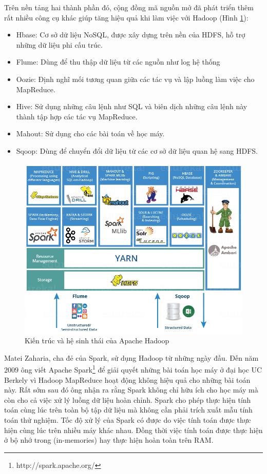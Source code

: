 Trên nền tảng hai thành phần đó, cộng đồng mã nguồn mở đã phát triển thêm rất nhiều công cụ khác giúp tăng hiệu quả khi làm việc với Hadoop (Hình \ref{fig:hadoop}):
\begin{itemize}
\item Hbase: Cơ sở dữ liệu NoSQL, được xây dựng trên nền của HDFS, hỗ trợ những dữ liệu phi cấu trúc.

\item Flume: Dùng để thu thập dữ liệu từ các nguồn như log hệ thống

\item Oozie: Định nghĩ mối tương quan giữa các tác vụ và lập luồng làm việc cho MapReduce.

\item Hive: Sử dụng những câu lệnh như SQL và biên dịch những câu lệnh này thành tập hợp các tác vụ MapReduce.

\item Mahout: Sử dụng cho các bài toán về học máy.

\item Sqoop: Dùng để chuyển đổi dữ liệu từ các cơ sở dữ liệu quan hệ sang HDFS.
\end{itemize}

\begin{figure}[H]
	\centering
	\includegraphics[width=0.9\linewidth]{Chapter4/Chapter4Figs/hadoop}
	\caption{Kiến trúc và hệ sinh thái của Apache Hadoop}
	\label{fig:hadoop}
\end{figure}

Matei Zaharia, cha đẻ của Spark, sử dụng Hadoop từ những ngày đầu. Đến năm $2009$ ông viết Apache Spark\footnote{http://spark.apache.org/} để giải quyết những bài toán học máy ở đại học UC Berkely vì Hadoop MapReduce hoạt động không hiệu quả cho những bài toán này. Rất sớm sau đó ông nhận ra rằng Spark không chỉ hữu ích cho học máy mà còn cho cả việc xử lý luồng dữ liệu hoàn chỉnh. Spark cho phép thực hiện tính toán cùng lúc trên toàn bộ tập dữ liệu mà không cần phải trích xuất mẫu tính toán thử nghiệm. Tốc độ xử lý của Spark có được do việc tính toán được thực hiện cùng lúc trên nhiều máy khác nhau. Đồng thời việc tính toán được thực hiện ở bộ nhớ trong (in-memories) hay thực hiện hoàn toàn trên RAM.

